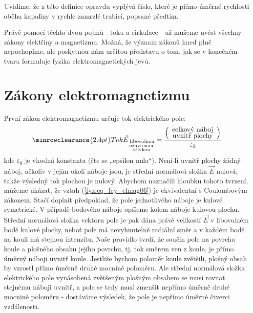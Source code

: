     Uvidíme, že z této definice opravdu vyplývá číslo, které je přímo úměrné rychlosti oběhu 
    kapaliny v rychle zamrzlé trubici, popsané předtím.
    
    Právě pomocí těchto dvou pojmů - toku a cirkulace - už můžeme uvést všechny zákony elektřiny a
    magnetizmu. Možná, že význam zákonů hned plně nepochopíme, ale poskytnou nám určitou představu 
    o tom, jak se v konečném tvaru formuluje fyzika elektromagnetických jevů.

  
  \section{Zákony elektromagnetizmu}
    První zákon elektromagnetizmu určuje tok elektrického pole:
    \begin{equation}\label{fyz:eq_fey_elmag06}
      \renewcommand\arraystretch{0.6} \setlength\minrowclearance{2.4pt}
      \text{Tok }\vec{E}_{\substack{\text{ libovolnou}\\\text{uzavřenou}\\\text{křivkou}}}
        = \frac{
          \left(\begin{array}{c}
            \text{celkový náboj}    \\
            \text{uvnitř plochy}
          \end{array}
        \right)      
        }{\varepsilon_0}
    \end{equation}
    kde \(\varepsilon_0\) je vhodná konstanta (čte se „epsilon nula“). Není-li uvnitř plochy žádný 
    náboj, ačkoliv v jejím okolí náboje jsou, je střední normálová složka \(\vec{E}\) nulová, takže 
    výsledný tok plochou je nulový. Abychom naznačili hloubku tohoto tvrzení, můžeme ukázat, že 
    vztah (\ref{fyz:eq_fey_elmag06}) je ekvivalentní s Coulombovým zákonem. Stačí doplnit 
    předpoklad, že pole jednotlivého náboje je kulové symetrické. V případě bodového náboje opíšeme 
    kolem náboje kulovou plochu. Střední normálová složka vektoru pole je pak dána právě velikostí 
    \(\vec{E}\) v libovolném bodě kulové plochy, neboť pole má nevyhnutelně radiální směr a v 
    každém bodě na kouli má stejnou intenzitu. Naše pravidlo tvrdí, že součin pole na povrchu koule 
    a plošného obsahu jejího povrchu, tj. tok směrem ven z koule, je přímo úměrný náboji uvnitř 
    koule. Jestliže bychom poloměr koule zvětšili, plošný obsah by vzrostl přímo úměrně druhé 
    mocnině poloměru. Ale střední normálová složka elektrického pole vynásobená zvětšeným plošným 
    obsahem se musí rovnat stejnému náboji uvnitř, a pole se tedy musí zmenšit nepřímo úměrně druhé 
    mocnině poloměru - dostáváme výsledek, že pole je nepřímo úměrné čtverci vzdálenosti.
    
